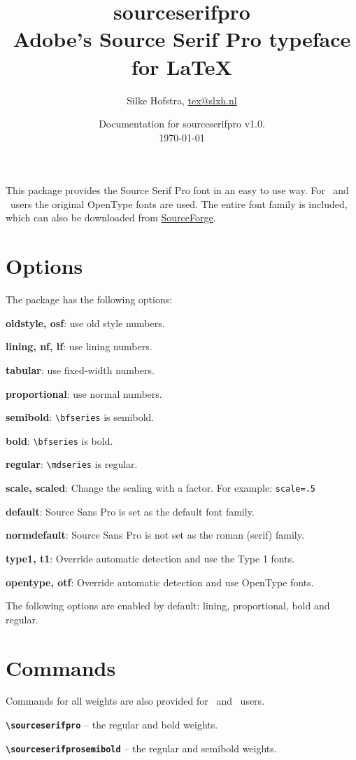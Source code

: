 \documentclass[11pt,a4paper,english]{article}
\title{\bfseries
	\Huge sourceserifpro\\
	\Large Adobe's Source Serif Pro typeface for \LaTeX
}
\author{Silke Hofstra, \href{mailto:tex@slxh.nl}{tex@slxh.nl}}
\date{Documentation for sourceserifpro v1.0.\\ \today}
\begin{document}
\maketitle
\begin{multicols}{2}
This package provides the Source Serif Pro font in an easy to use way. For \XeLaTeX\ and \LuaLaTeX\ users the original OpenType fonts are used. The entire font family is included, which can also be downloaded from \href{sourceforge.net/projects/sourceserifpro.adobe}{SourceForge}.

\section{Options}
The package has the following options:
\begin{itemize*}
	\item \textbf{oldstyle, osf}:  use old style numbers.
	\item \textbf{lining, nf, lf}: use lining numbers.
	\item \textbf{tabular}:        use fixed-width numbers.
	\item \textbf{proportional}:   use normal numbers.
	\item \textbf{semibold}:       \texttt{\textbackslash bfseries} is semibold.
	\item \textbf{bold}:           \texttt{\textbackslash bfseries} is bold.
	\item \textbf{regular}:        \texttt{\textbackslash mdseries} is regular.
	\item \textbf{scale, scaled}:  Change the scaling with a factor. For example:  \texttt{scale=.5}
	\item \textbf{default}:        Source Sans Pro is set as the default font family.
	\item \textbf{normdefault}:    Source Sans Pro is not set as the roman (serif) family.
	\item \textbf{type1, t1}:      Override automatic detection and use the Type 1 fonts.
	\item \textbf{opentype, otf}:  Override automatic detection and use OpenType fonts.
\end{itemize*}
The following options are enabled by default: lining, proportional, bold and regular.

\section{Commands}
Commands for all weights are also provided for \XeLaTeX\ and \LuaLaTeX\ users.
\begin{itemize*}
	\item \texttt{\bfseries \textbackslash sourceserifpro}
		-- the regular and bold weights.
	\item \texttt{\bfseries \textbackslash sourceserifprosemibold}
		-- the regular and semibold weights.
\end{itemize*}


\end{multicols}
\end{document}
